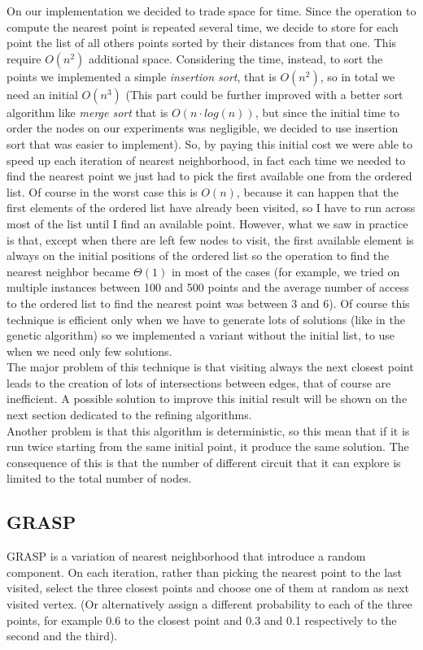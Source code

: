 \noindent On our implementation we decided to trade space for time. Since the operation to compute the nearest point is repeated several time, we decide to store for each point the list of all others points sorted by their distances from that one. This require $O(n^2)$ additional space. Considering the time, instead, to sort the points we implemented a simple \textit{insertion sort}, that is $O(n^2)$, so in total we need an initial $O(n^3)$ (This part could be further improved with a better sort algorithm like \textit{merge sort} that is $O(n \cdot log(n))$, but since the initial time to order the nodes on our experiments was negligible, we decided to use insertion sort that was easier to implement). So, by paying this initial cost we were able to speed up each iteration of nearest neighborhood, in fact each time we needed to find the nearest point we just had to pick the first available one from the ordered list. Of course in the worst case this is $O(n)$, because it can happen that the first elements of the ordered list have already been visited, so I have to run across most of the list until I find an available point. However, what we saw in practice is that, except when there are left few nodes to visit, the first available element is always on the initial positions of the ordered list so the operation to find the nearest neighbor became $\Theta(1)$ in most of the cases (for example, we tried on multiple instances between 100 and 500 points and the average number of access to the ordered list to find the nearest point was between 3 and 6). Of course this technique is efficient only when we have to generate lots of solutions (like in the genetic algorithm) so we implemented a variant without the initial list, to use when we need only few solutions.\\

\noindent The major problem of this technique is that visiting always the next closest point leads to the creation of lots of intersections between edges, that of course are inefficient. A possible solution to improve this initial result will be shown on the next section dedicated to the refining algorithms. \\
Another problem is that this algorithm is deterministic, so this mean that if it is run twice starting from the same initial point, it produce the same solution. The consequence of this is that the number of different circuit that it can explore is limited to the total number of nodes.

\subsection{GRASP}
\label{sec:grasp}
GRASP is a variation of nearest neighborhood that introduce a random component. On each iteration, rather than picking the nearest point to the last visited, select the three closest points and choose one of them at random as next visited vertex. 
(Or alternatively assign a different probability to each of the three points, for example 0.6 to the closest point and 0.3 and 0.1 respectively to the second and the third).


